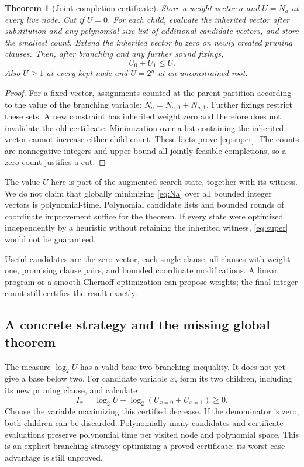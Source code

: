 \documentclass[11pt,a4paper]{article}
\newtheorem{theorem}[proposition]{Theorem}
\theoremstyle{remark}
\begin{document}
\begin{theorem}[Joint completion certificate]
Store a weight vector $a$ and $U=N_a$ at every live node. Cut if $U=0$.
For each child, evaluate the inherited vector after substitution and any
polynomial-size list of additional candidate vectors, and store the smallest
count. Extend the inherited vector by zero on newly created pruning clauses.
Then, after branching and any further sound fixings,
\begin{equation}
 U_0+U_1\le U.                                             \label{eq:super}
\end{equation}
Also $U\ge1$ at every kept node and $U=2^n$ at an unconstrained root.
\end{theorem}
\begin{proof}
For a fixed vector, assignments counted at the parent partition according
to the value of the branching variable:
$N_a=N_{a,0}+N_{a,1}$. Further fixings restrict these sets. A new constraint
has inherited weight zero and therefore does not invalidate the old
certificate. Minimization over a list containing the inherited vector
cannot increase either child count. These facts prove \eqref{eq:super}.
The counts are nonnegative integers and upper-bound all jointly feasible
completions, so a zero count justifies a cut.
\end{proof}

The value $U$ here is part of the augmented search state, together with its
witness. We do not claim that globally minimizing \eqref{eq:Na} over all
bounded integer vectors is polynomial-time. Polynomial candidate lists and
bounded rounds of coordinate improvement suffice for the theorem.
If every state were optimized independently by a heuristic without retaining
the inherited witness, \eqref{eq:super} would not be guaranteed.

Useful candidates are the zero vector, each single clause, all clauses with
weight one, promising clause pairs, and bounded coordinate modifications.
A linear program or a smooth Chernoff optimization can propose weights;
the final integer count still certifies the result exactly.

\subsection{A concrete strategy and the missing global theorem}

The measure $\log_2 U$ has a valid base-two branching inequality. It does
not yet give a base below two. For candidate variable $x$, form its two
children, including its new pruning clause, and calculate
\begin{equation}
 I_x=\log_2 U-\log_2(U_{x=0}+U_{x=1})\ge0.                \label{eq:info}
\end{equation}
Choose the variable maximizing this certified decrease. If the denominator
is zero, both children can be discarded. Polynomially many candidates and
certificate evaluations preserve polynomial time per visited node and
polynomial space. This is an explicit branching strategy optimizing a
proved certificate; its worst-case advantage is still unproved.
\end{document}
